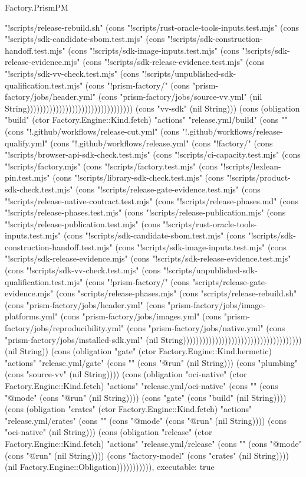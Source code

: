 \begin{lexlean}{Factory.PrismPM}
\begin{semanticmodule}
{"!scripts/release-rebuild.sh" (cons "!scripts/rust-oracle-tools-inputs.test.mjs" (cons "!scripts/sdk-candidate-sbom.test.mjs" (cons "!scripts/sdk-construction-handoff.test.mjs" (cons "!scripts/sdk-image-inputs.test.mjs" (cons "!scripts/sdk-release-evidence.mjs" (cons "!scripts/sdk-release-evidence.test.mjs" (cons "!scripts/sdk-vv-check.test.mjs" (cons "!scripts/unpublished-sdk-qualification.test.mjs" (cons "!prism-factory/" (cons "prism-factory/jobs/header.yml" (cons "prism-factory/jobs/source-vv.yml" (nil String))))))))))))))))))))))))))))))))) (cons "vv-sdk" (nil String))) (cons (obligation "build" (ctor Factory.Engine::Kind.fetch) "actions" "release.yml/build" (cons "" (cons "!.github/workflows/release-cut.yml" (cons "!.github/workflows/release-qualify.yml" (cons "!.github/workflows/release.yml" (cons "!factory/" (cons "!scripts/browser-api-sdk-check.test.mjs" (cons "!scripts/ci-capacity.test.mjs" (cons "!scripts/factory.mjs" (cons "!scripts/factory.test.mjs" (cons "!scripts/lexlean-pin.test.mjs" (cons "!scripts/library-sdk-check.test.mjs" (cons "!scripts/product-sdk-check.test.mjs" (cons "!scripts/release-gate-evidence.test.mjs" (cons "!scripts/release-native-contract.test.mjs" (cons "!scripts/release-phases.md" (cons "!scripts/release-phases.test.mjs" (cons "!scripts/release-publication.mjs" (cons "!scripts/release-publication.test.mjs" (cons "!scripts/rust-oracle-tools-inputs.test.mjs" (cons "!scripts/sdk-candidate-sbom.test.mjs" (cons "!scripts/sdk-construction-handoff.test.mjs" (cons "!scripts/sdk-image-inputs.test.mjs" (cons "!scripts/sdk-release-evidence.mjs" (cons "!scripts/sdk-release-evidence.test.mjs" (cons "!scripts/sdk-vv-check.test.mjs" (cons "!scripts/unpublished-sdk-qualification.test.mjs" (cons "!prism-factory/" (cons "scripts/release-gate-evidence.mjs" (cons "scripts/release-phases.mjs" (cons "scripts/release-rebuild.sh" (cons "prism-factory/jobs/header.yml" (cons "prism-factory/jobs/image-platforms.yml" (cons "prism-factory/jobs/images.yml" (cons "prism-factory/jobs/reproducibility.yml" (cons "prism-factory/jobs/native.yml" (cons "prism-factory/jobs/installed-sdk.yml" (nil String))))))))))))))))))))))))))))))))))))) (nil String)) (cons (obligation "gate" (ctor Factory.Engine::Kind.hermetic) "actions" "release.yml/gate" (cons "" (cons "@run" (nil String))) (cons "plumbing" (cons "source-vv" (nil String)))) (cons (obligation "oci-native" (ctor Factory.Engine::Kind.fetch) "actions" "release.yml/oci-native" (cons "" (cons "@mode" (cons "@run" (nil String)))) (cons "gate" (cons "build" (nil String)))) (cons (obligation "crates" (ctor Factory.Engine::Kind.fetch) "actions" "release.yml/crates" (cons "" (cons "@mode" (cons "@run" (nil String)))) (cons "oci-native" (nil String))) (cons (obligation "release" (ctor Factory.Engine::Kind.fetch) "actions" "release.yml/release" (cons "" (cons "@mode" (cons "@run" (nil String)))) (cons "factory-model" (cons "crates" (nil String)))) (nil Factory.Engine::Obligation))))))))))),
  executable: true
}


\end{semanticmodule}
\end{lexlean}
